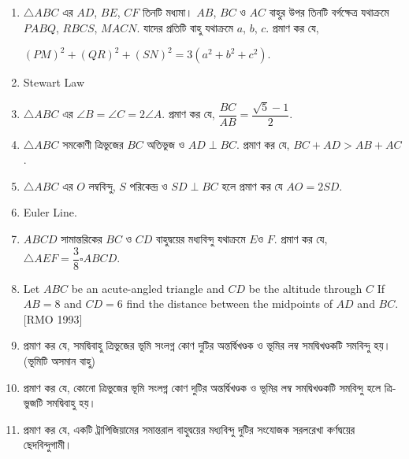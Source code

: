 \documentclass[11pt, a4paper]{article}
\begin{document}
\begin{enumerate}
	 \item $ \bigtriangleup ABC $ \textbengali{এর} $AD$, $BE$, $CF$ \textbengali{তিনটি মধ্যমা।} $ AB $, $BC$ \textbengali{ও} $ AC $ \textbengali{বাহুর উপর তিনটি বর্গক্ষেত্র যথাক্রমে} $ PABQ $, $ RBCS $, $ MACN. $ \textbengali{যাদের প্রতিটি বাহু যথাক্রমে} $a$, $b$, $c$. \textbengali{প্রমাণ কর যে,} 
	\begin{center}
	$ (PM)^2 + (QR)^2 + (SN)^2 = 3(a^2 + b^2 + c^2). $
	 \end{center}
	 \item Stewart Law
	 
	 \item $ \bigtriangleup ABC $ \textbengali{এর} $ \angle B = \angle C = 2\angle A $. \textbengali{প্রমাণ কর যে,}  $ \dfrac{BC}{AB} = \dfrac{\sqrt{5}-1}{2} $.
	 
	 \item $ \bigtriangleup ABC $ \textbengali{সমকোণী ত্রিভুজের} $ BC $ \textbengali{অতিভুজ ও} $ AD \perp BC $. \textbengali{প্রমাণ কর যে,} $ BC + AD > AB + AC $.
	 
	 \item $ \bigtriangleup ABC $ \textbengali{এর} $O$ \textbengali{লম্ববিন্দু}, $S$ \textbengali{পরিকেন্দ্র ও} $SD \perp BC $ \textbengali{হলে প্রমাণ কর যে } $ AO = 2SD  $.
	 
	 \item Euler Line.
	 
	 \item $ABCD$ \textbengali{সামান্তরিকের} $BC$ \textbengali{ও} $CD$ \textbengali{বাহুদ্বয়ের মধ্যবিন্দু যথাক্রমে} $E$\textbengali{ও} $F$. \textbengali{প্রমাণ কর যে,} $ \bigtriangleup AEF = \dfrac{3}{8} \square ABCD $.
	 
	 \item Let $ABC$ be an acute-angled triangle and $CD$ be the altitude through $C$ If $AB = 8$ and $CD = 6$ find the distance between the midpoints of $AD$ and $BC$. [RMO 1993]
	 
	 \item \textbengali{প্রমাণ কর যে, সমদ্বিবাহু ত্রিভুজের ভূমি সংলগ্ন কোণ দুটির অন্তর্দ্বিখণ্ডক ও ভূমির লম্ব সমদ্বিখণ্ডকটি সমবিন্দু হয়।} (\textbengali{ভূমিটি অসমান বাহু})
	 
	 \item \textbengali{প্রমাণ কর যে, কোনো ত্রিভুজের ভূমি সংলগ্ন কোণ দুটির অন্তর্দ্বিখণ্ডক ও ভূমির লম্ব সমদ্বিখণ্ডকটি সমবিন্দু হলে ত্রিভুজটি সমদ্বিবাহু হয়।}
	 
	 \item \textbengali{প্রমাণ কর যে, একটি ট্রাপিজিয়ামের সমান্তরাল বাহুদ্বয়ের মধ্যবিন্দু দুটির সংযোজক সরলরেখা কর্ণদ্বয়ের ছেদবিন্দুগামী।}
	 

\end{enumerate}
\end{document}
